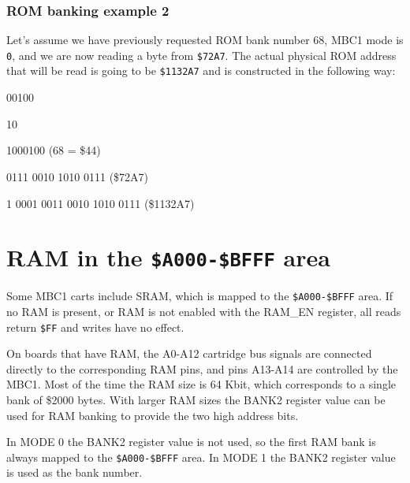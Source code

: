 \subsubsection{ROM banking example 2}

Let's assume we have previously requested ROM bank number 68, MBC1 mode is
\texttt{0}, and we are now reading a byte from \texttt{\$72A7}. The actual
physical ROM address that will be read is going to be \texttt{\$1132A7} and is
constructed in the following way:

\begin{description}[leftmargin=15em,style=nextline]
  \item[Value of the BANK1 register]
  {
    \ttfamily
    \colorbox{blue!30}{00100}
  }
  \item[Value of the BANK2 register]
  {
    \ttfamily
    \colorbox{red!30}{10}
  }
  \item[ROM bank number]
  {
    \ttfamily
    \colorbox{red!30}{10}\colorbox{blue!30}{00100} (68 = \$44)
  }
  \item[Address being read]
  {
    \ttfamily
    \colorbox{gray!10}{01}\colorbox{green!30}{11 0010 1010 0111} (\$72A7)
  }
  \item[Actual physical ROM address]
  {
    \ttfamily
    \colorbox{red!30}{1 0}\colorbox{blue!30}{001 00}\colorbox{green!30}{11 0010 1010 0111} (\$1132A7)
  }
\end{description}

\section{RAM in the \texttt{\$A000-\$BFFF} area}

Some MBC1 carts include SRAM, which is mapped to the \texttt{\$A000-\$BFFF}
area. If no RAM is present, or RAM is not enabled with the RAM\_EN register,
all reads return \texttt{\$FF} and writes have no effect.

On boards that have RAM, the A0-A12 cartridge bus signals are connected
directly to the corresponding RAM pins, and pins A13-A14 are controlled by the
MBC1. Most of the time the RAM size is 64 Kbit, which corresponds to a single
bank of \$2000 bytes. With larger RAM sizes the BANK2 register value can be
used for RAM banking to provide the two high address bits.

In MODE 0 the BANK2 register value is not used, so the first RAM bank is always
mapped to the \texttt{\$A000-\$BFFF} area. In MODE 1 the BANK2 register value
is used as the bank number.

